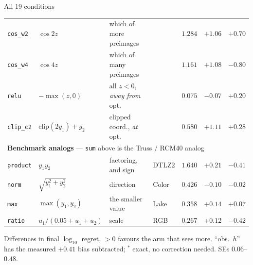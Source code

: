 \documentclass[aspectratio=169,11pt]{beamer}
\newcommand{\good}{\textcolor{green!50!black}}
\begin{document}
\begin{frame}[shrink=8]{All 19 conditions}
\begin{center}
\begin{tabular}{llllrrr}
\texttt{cos\_w2}  & $\cos 2z$                 & which of more preimages   &                    & $1.284$ & $+1.06$ & $+0.70$ \\
\texttt{cos\_w4}  & $\cos 4z$                 & which of many preimages   &                    & $1.161$ & $+1.08$ & $-0.80$ \\
\texttt{relu}     & $-\max(z,0)$              & all $z<0$, \emph{away from} opt. &             & $0.075$ & \good{$-0.07$} & $+0.20$ \\
\texttt{clip\_c2} & $\text{clip}(2y_1)+y_2$   & clipped coord., \emph{at} opt.   &             & $0.580$ & \good{$+1.11$} & $+0.28$ \\
\midrule
\multicolumn{7}{l}{\textbf{Benchmark analogs} --- \texttt{sum} above is the Truss / RCM40 analog}\\
\texttt{product} & $y_1y_2$               & factoring, and sign   & DTLZ2        & $1.640$ & $+0.21$ & $-0.41$ \\
\texttt{norm}    & $\sqrt{y_1^2+y_2^2}$   & direction             & Color        & $0.426$ & $-0.10$ & $-0.02$ \\
\texttt{max}     & $\max(y_1,y_2)$        & the smaller value     & Lake         & $0.358$ & $+0.14$ & $+0.07$ \\
\texttt{ratio}   & $u_1/(0.05+u_1+u_2)$   & scale                 & RGB          & $0.267$ & $+0.12$ & $-0.42$ \\
\bottomrule
\end{tabular}
\end{center}

\vspace{2pt}
{\tiny Differences in final $\log_{10}$ regret, $>0$ favours the arm that sees
more. ``obs.\ $h$'' has the measured $+0.41$ bias subtracted;
$^\ast$ exact, no correction needed. SEs $0.06$--$0.48$.}

\end{frame}
\end{document}
